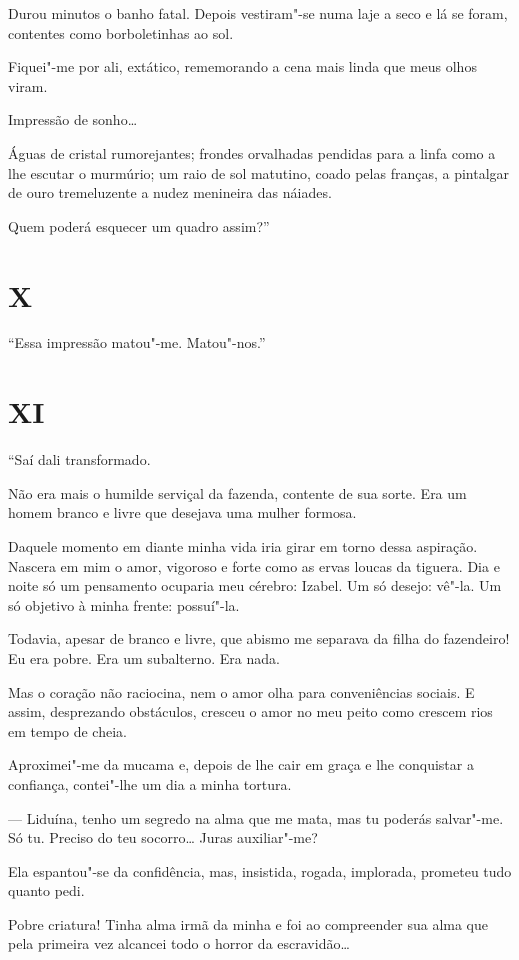 Durou minutos o banho fatal. Depois vestiram"-se numa laje a seco e lá se
foram, contentes como borboletinhas ao sol.

Fiquei"-me por ali, extático, rememorando a cena mais linda que meus
olhos viram.

Impressão de sonho\ldots{}

Águas de cristal rumorejantes; frondes orvalhadas pendidas para a linfa
como a lhe escutar o murmúrio; um raio de sol matutino, coado pelas
franças, a pintalgar de ouro tremeluzente a nudez menineira das náiades.

Quem poderá esquecer um quadro assim?''

\section*{X}

``Essa impressão matou"-me. Matou"-nos.''

\section*{XI}

``Saí dali transformado.

Não era mais o humilde serviçal da fazenda, contente de sua sorte. Era
um homem branco e livre que desejava uma mulher formosa.

Daquele momento em diante minha vida iria girar em torno dessa
aspiração. Nascera em mim o amor, vigoroso e forte como as ervas loucas
da tiguera. Dia e noite só um pensamento ocuparia meu cérebro: Izabel.
Um só desejo: vê"-la. Um só objetivo à minha frente: possuí"-la.

Todavia, apesar de branco e livre, que abismo me separava da filha do
fazendeiro! Eu era pobre. Era um subalterno. Era nada.

Mas o coração não raciocina, nem o amor olha para conveniências sociais.
E assim, desprezando obstáculos, cresceu o amor no meu peito como
crescem rios em tempo de cheia.

Aproximei"-me da mucama e, depois de lhe cair em graça e lhe conquistar a
confiança, contei"-lhe um dia a minha tortura.

--- Liduína, tenho um segredo na alma que me mata, mas tu poderás
salvar"-me. Só tu. Preciso do teu socorro\ldots{} Juras auxiliar"-me?

Ela espantou"-se da confidência, mas, insistida, rogada, implorada,
prometeu tudo quanto pedi.

Pobre criatura! Tinha alma irmã da minha e foi ao compreender sua alma
que pela primeira vez alcancei todo o horror da escravidão\ldots{}

